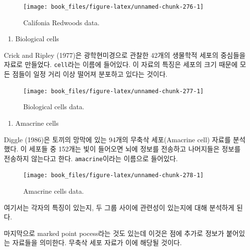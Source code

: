 \documentclass[b5paper,]{scrbook}
\providecommand{\tightlist}{%
  \setlength{\itemsep}{0pt}\setlength{\parskip}{0pt}}
\theoremstyle{plain}
\theoremstyle{definition}
\numberwithin{equation}{section}
\begin{document}
\begin{figure}

{\centering \texttt{[image: book\_files/figure-latex/unnamed-chunk-276-1]} 

}

\caption{Califonia Redwoods data.}\label{fig:unnamed-chunk-276}
\end{figure}

\begin{enumerate}
\def\labelenumi{\arabic{enumi}.}
\setcounter{enumi}{2}
\tightlist
\item
  Biological cells
\end{enumerate}

Crick and Ripley (1977)은 광학현미경으로 관찰한 42개의 생물학적 세포의
중심들을 자료로 만들었다. \texttt{cell}라는 이름에 들어있다. 이 자료의
특징은 세포의 크기 때문에 모든 점들이 일정 거리 이상 떨어져 분포하고
있다는 것이다.

\begin{figure}

{\centering \texttt{[image: book\_files/figure-latex/unnamed-chunk-277-1]} 

}

\caption{Biological cells data.}\label{fig:unnamed-chunk-277}
\end{figure}

\begin{enumerate}
\def\labelenumi{\arabic{enumi}.}
\setcounter{enumi}{3}
\tightlist
\item
  Amacrine cells
\end{enumerate}

Diggle (1986)은 토끼의 망막에 있는 94개의 무축삭 세포(Amacrine cell)
자료를 분석했다. 이 세포들 중 152개는 빛이 들어오면 뇌에 정보를 전송하고
나머지들은 정보를 전송하지 않는다고 한다. \texttt{amacrine}이라는
이름으로 들어있다.

\begin{figure}

{\centering \texttt{[image: book\_files/figure-latex/unnamed-chunk-278-1]} 

}

\caption{Amacrine cells data.}\label{fig:unnamed-chunk-278}
\end{figure}

여기서는 각자의 특징이 있는지, 두 그룹 사이에 관련성이 있는지에 대해
분석하게 된다.

마지막으로 marked point pocess라는 것도 있는데 이것은 점에 추가로 정보가
붙어있는 자료들을 의미한다. 무축삭 세포 자료가 이에 해당될 것이다.
\end{document}
